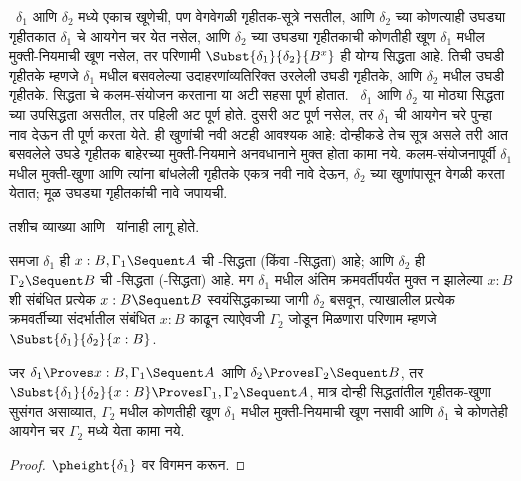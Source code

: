 ~$\delta_1$ आणि $\delta_2$
मध्ये एकाच खूणेची, पण वेगवेगळी
गृहीतक-सूत्रे नसतील,
आणि $\delta_2$ च्या कोणत्याही
उघड्या गृहीतकात $\delta_1$
चे आयगेन चर येत नसेल,
आणि $\delta_2$ च्या उघड्या गृहीतकाची कोणतीही खूण
$\delta_1$ मधील मुक्ती-नियमाची खूण नसेल,
तर परिणामी
$\Subst{\delta_1}{\delta_2}{B^x}$
ही योग्य सिद्धता आहे.
तिची उघडी गृहीतके म्हणजे
$\delta_1$ मधील बसवलेल्या
उदाहरणांव्यतिरिक्त
उरलेली उघडी गृहीतके,
आणि $\delta_2$ मधील
उघडी गृहीतके.
सिद्धता चे कलम-संयोजन
करताना या अटी सहसा पूर्ण होतात.
~$\delta_1$ आणि $\delta_2$
या मोठ्या सिद्धता
च्या उपसिद्धता असतील,
तर पहिली अट पूर्ण होते.
दुसरी अट पूर्ण नसेल,
तर $\delta_1$ ची आयगेन चरे
पुन्हा नाव देऊन ती पूर्ण
करता येते.
ही खुणांची नवी अटही आवश्यक आहे: दोन्हीकडे तेच सूत्र
असले तरी आत बसवलेले उघडे गृहीतक बाहेरच्या मुक्ती-नियमाने
अनवधानाने मुक्त होता कामा नये. कलम-संयोजनापूर्वी
$\delta_1$ मधील मुक्ती-खुणा आणि त्यांना बांधलेली गृहीतके
एकत्र नवी नावे देऊन, $\delta_2$ च्या खुणांपासून वेगळी
करता येतात; मूळ उघड्या गृहीतकांची नावे जपायची.

तशीच व्याख्या
 आणि~
यांनाही लागू होते.

\begin{defn}
समजा $\delta_1$ ही
$x:B, \Gamma_1 \Sequent A$
ची -सिद्धता
(किंवा -सिद्धता) आहे;
आणि $\delta_2$ ही
$\Gamma_2 \Sequent B$
ची -सिद्धता
(-सिद्धता) आहे.
मग $\delta_1$ मधील
अंतिम क्रमवर्तीपर्यंत मुक्त न झालेल्या
$x:B$ शी संबंधित प्रत्येक $x:B \Sequent B$
स्वयंसिद्धकाच्या जागी $\delta_2$ बसवून,
त्याखालील प्रत्येक क्रमवर्तीच्या संदर्भातील
संबंधित $x:B$ काढून त्याऐवजी $\Gamma_2$ जोडून
मिळणारा परिणाम म्हणजे
$\Subst{\delta_1}{\delta_2}{x:B}$.
\end{defn}

\begin{prop}
जर $\delta_1 \Proves
x:B, \Gamma_1 \Sequent
A$ आणि $\delta_2 \Proves
\Gamma_2 \Sequent B$,
तर $\Subst{\delta_1}{\delta_2}{x:B}
\Proves \Gamma_1, \Gamma_2 \Sequent
A$, मात्र दोन्ही सिद्धतांतील गृहीतक-खुणा सुसंगत असाव्यात,
$\Gamma_2$ मधील कोणतीही खूण $\delta_1$ मधील
मुक्ती-नियमाची खूण नसावी आणि $\delta_1$ चे
कोणतेही आयगेन चर $\Gamma_2$ मध्ये येता कामा नये.
\end{prop}

\begin{proof}
  $\pheight{\delta_1}$ वर
  विगमन करून.
\end{proof}












